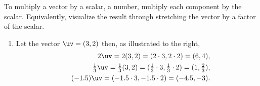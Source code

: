 \begin{example} 
To multiply a vector by a scalar, a number, multiply each component by the scalar. 
Equivalently, visualize the result through stretching the vector by a factor of the scalar.
\begin{enumerate}
\item \begin{figbox}{}%
Let the vector \(\uv=(3,2)\) then, as illustrated to the right,
\begin{eqnarray*}&&
2\uv=2(3,2) =(2\cdot3,2\cdot2) =(6,4),
\\&&
\tfrac13\uv=\tfrac13(3,2) =(\tfrac13\cdot3,\tfrac13\cdot2) =(1,\tfrac23),
\\&&
(-1.5)\uv =(-1.5\cdot3,-1.5\cdot2) =(-4.5,-3).
\end{eqnarray*}
\end{figbox}


\end{enumerate}
\end{example}
